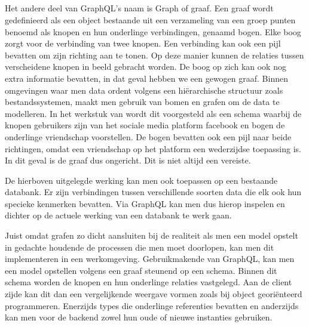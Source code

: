 \subsection{}%
\label{sec:graaf}
Het andere deel van GraphQL's naam is Graph of graaf. Een graaf wordt gedefinieerd als een object bestaande uit een verzameling van een groep punten benoemd als knopen en hun onderlinge verbindingen, genaamd bogen. Elke boog zorgt voor de verbinding van twee knopen. Een verbinding kan ook een pijl bevatten om zijn richting aan te tonen. Op deze manier kunnen de relaties tussen verscheidene knopen in beeld gebracht worden. De boog op zich kan ook nog extra informatie bevatten, in dat geval hebben we een gewogen graaf. Binnen omgevingen waar men data ordent volgens een hiërarchische structuur zoals bestandssystemen, maakt men gebruik van bomen en grafen om de data te modelleren.\autocite{Lievens2021} In het werkstuk van \textcite{Brysbaert2021} wordt dit voorgesteld als een schema waarbij de knopen gebruikers zijn van het sociale media platform facebook en bogen de onderlinge vriendschap voorstellen. De bogen bevatten ook een pijl naar beide richtingen, omdat een vriendschap op het platform een wederzijdse toepassing is. In dit geval is de graaf dus ongericht. Dit is niet altijd een vereiste.

De hierboven uitgelegde werking kan men ook toepassen op een bestaande databank. Er zijn verbindingen tussen verschillende soorten data die elk ook hun specieke kenmerken bevatten. Via GraphQL kan men dus hierop inspelen en dichter op de actuele werking van een databank te werk gaan.

Juist omdat grafen zo dicht aansluiten bij de realiteit als men een model opstelt in gedachte houdende de processen die men moet doorlopen, kan men dit implementeren in een werkomgeving. Gebruikmakende van GraphQL, kan men een model opstellen volgens een graaf steunend op een schema. Binnen dit schema worden de knopen en hun onderlinge relaties vastgelegd. Aan de client zijde kan dit dan een vergelijkende weergave vormen zoals bij object georiënteerd programmeren. Enerzijds types die onderlinge referenties bevatten en anderzijds kan men voor de backend zowel hun oude of nieuwe instanties gebruiken.\autocite{GraphQLFoundation2022}

